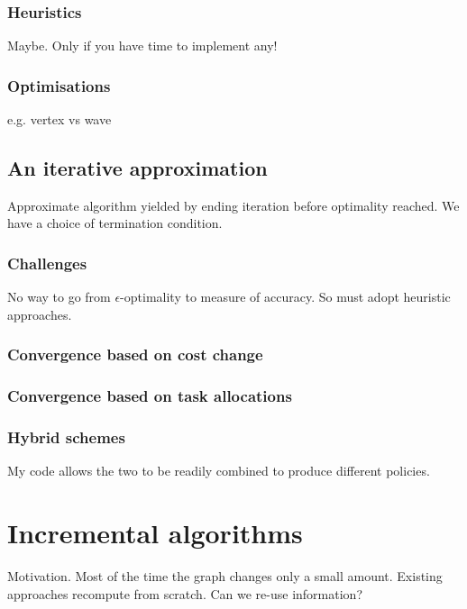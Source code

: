 \subsubsection{Heuristics}

Maybe. Only if you have time to implement any!

\subsubsection{Optimisations}

e.g. vertex vs wave

\subsection{An iterative approximation}

Approximate algorithm yielded by ending iteration before optimality reached. We have a choice of termination condition.

\subsubsection{Challenges} 

No way to go from $\epsilon$-optimality to measure of accuracy. So must adopt heuristic approaches.

\subsubsection{Convergence based on cost change}

\subsubsection{Convergence based on task allocations}

\subsubsection{Hybrid schemes}

My code allows the two to be readily combined to produce different policies.

\section{Incremental algorithms}

Motivation. Most of the time the graph changes only a small amount. Existing approaches recompute from scratch. Can we re-use information?

